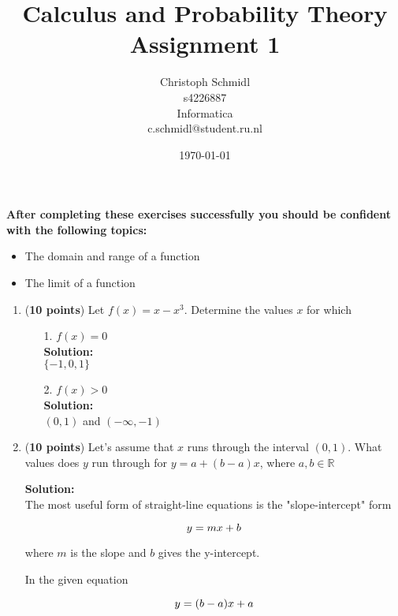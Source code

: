 \documentclass[a4paper]{article}
\title{Calculus and Probability Theory\\ Assignment 1}
\author{Christoph Schmidl\\
s4226887\\
Informatica\\
c.schmidl@student.ru.nl\\}
\date{\today}
\begin{document}
\maketitle

\textbf{After completing these exercises successfully you should be confident with the following topics:}

\begin{itemize}
	\item The domain and range of a function
	\item The limit of a function
\end{itemize}
\vspace{1em}

\begin{enumerate}

\item (\textbf{10 points}) Let $f(x) = x - x^3$. Determine the values $x$ for which


\begin{enumerate}
	\item[1.] $f(x) = 0$\\
	\textbf{Solution:}\\
	
	$\{-1,0,1\}$
		
	\item[2.] $f(x) > 0$\\
	\textbf{Solution:}\\
	
	$(0,1)$ and $(-\infty, -1)$
\end{enumerate}


\item (\textbf{10 points}) Let's assume that $x$ runs through the interval $(0,1)$. What values does $y$ run through for $y = a + (b - a)x$, where $a,b \in \mathbb{R}$

\textbf{Solution:}\\

The most useful form of straight-line equations is the "slope-intercept" form

\begin{equation}
	y = mx + b \notag
\end{equation}

where $m$ is the slope and $b$ gives the y-intercept.

In the given equation 

\begin{equation}
	y = (b-a)x + a \notag
\end{equation}


\end{enumerate}
\end{document}
